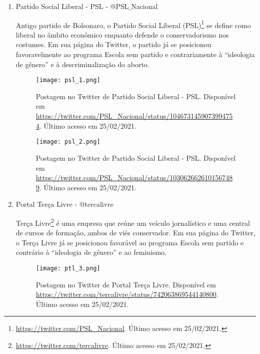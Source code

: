 \documentclass[
	12pt,				%
	openright,			%
	twoside,			%
	a4paper,			%
	english,			%
	brazil				%
	]{abntex2}
\begin{document}
\begin{anexosenv}
\begin{enumerate}
 \begin{figure}[!htbp]
    \centering
    \texttt{[image: mab\_1.png]}
    \caption{Postagem no Twitter de Movimento Avança Brasil. Disponível em \url{https://twitter.com/MAvancaBrasil/status/1050203324987920385}. Último acesso em 25/02/2021.}
 \end{figure}
  
  \newpage
  
 \item Partido Social Liberal - PSL - @PSL$\_$Nacional \label{psl}
 
 Antigo partido de Bolsonaro, o Partido Social Liberal (PSL)\footnote{\url{https://twitter.com/PSL_Nacional}. Último acesso em 25/02/2021.} se define como liberal no âmbito econômico enquanto defende o conservadorismo nos costumes. Em sua página do Twitter, o partido já se posicionou favoravelmente ao programa Escola sem partido e contrariamente à ``ideologia de gênero'' e à descriminalização do aborto.
 
 \begin{figure}[!htbp]
    \centering
    \texttt{[image: psl\_1.png]}
    \caption{Postagem no Twitter de Partido Social Liberal - PSL. Disponível em \url{https://twitter.com/PSL_Nacional/status/1046731459073994754}. Último acesso em 25/02/2021.}
 \end{figure}
 
 \begin{figure}[!htbp]
    \centering
    \texttt{[image: psl\_2.png]}
    \caption{Postagem no Twitter de Partido Social Liberal - PSL. Disponível em \url{https://twitter.com/PSL_Nacional/status/1030626626101567489}. Último acesso em 25/02/2021.}
 \end{figure}
 
  \newpage
  
 \item Portal Terça Livre - @tercalivre
 
 Terça Livre\footnote{\url{https://twitter.com/tercalivre}. Último acesso em 25/02/2021.} é uma empresa que reúne um veículo jornalístico e uma central de cursos de formação, ambos de viés conservador. Em sua página do Twitter, o Terça Livre já se posicionou favorável ao programa Escola sem partido e contrário à ``ideologia de gênero'' e ao feminismo.
 
 \begin{figure}[!htbp]
    \centering
    \texttt{[image: ptl\_3.png]}
    \caption{Postagem no Twitter de Portal Terça Livre. Disponível em \url{https://twitter.com/tercalivre/status/742063869544140800}. Último acesso em 25/02/2021.}
 \end{figure}
  

\end{enumerate}
\end{anexosenv}
\end{document}
